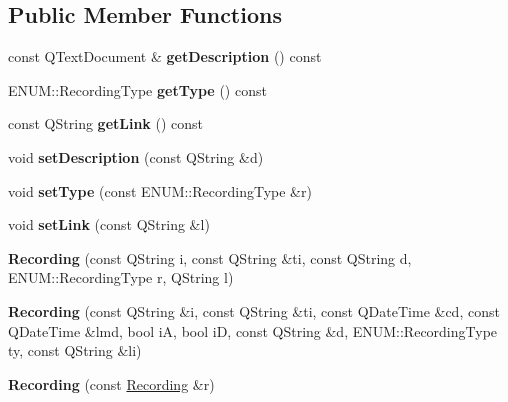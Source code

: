 \subsection*{Public Member Functions}
\begin{DoxyCompactItemize}
\item 
\mbox{\label{class_recording_a4e0e357b15bf6409148f44ddb8ecd19b}} 
const Q\+Text\+Document \& {\bfseries get\+Description} () const
\item 
\mbox{\label{class_recording_a60a269e2cb74dd0b1e3781580d22bdcc}} 
E\+N\+U\+M\+::\+Recording\+Type {\bfseries get\+Type} () const
\item 
\mbox{\label{class_recording_afccf7d9ec99810c4b4a7f348069e5760}} 
const Q\+String {\bfseries get\+Link} () const
\item 
\mbox{\label{class_recording_ac00ad5d97ab59f489bcb20ea68316fa4}} 
void {\bfseries set\+Description} (const Q\+String \&d)
\item 
\mbox{\label{class_recording_a4c2d04de136f59e122bc05c8c581a550}} 
void {\bfseries set\+Type} (const E\+N\+U\+M\+::\+Recording\+Type \&r)
\item 
\mbox{\label{class_recording_aa8c715e910a52614d836a4ea8572bd20}} 
void {\bfseries set\+Link} (const Q\+String \&l)
\item 
\mbox{\label{class_recording_a2e3359660cd7573807fb46c15daf4e78}} 
{\bfseries Recording} (const Q\+String i, const Q\+String \&ti, const Q\+String d, E\+N\+U\+M\+::\+Recording\+Type r, Q\+String l)
\item 
\mbox{\label{class_recording_a93af6ebb8ec5ae00ac85679756c82049}} 
{\bfseries Recording} (const Q\+String \&i, const Q\+String \&ti, const Q\+Date\+Time \&cd, const Q\+Date\+Time \&lmd, bool iA, bool iD, const Q\+String \&d, E\+N\+U\+M\+::\+Recording\+Type ty, const Q\+String \&li)
\item 
\mbox{\label{class_recording_ab354d60b8ecb06699378a849f6143ac6}} 
{\bfseries Recording} (const \hyperlink{class_recording}{Recording} \&r)

\end{DoxyCompactItemize}
